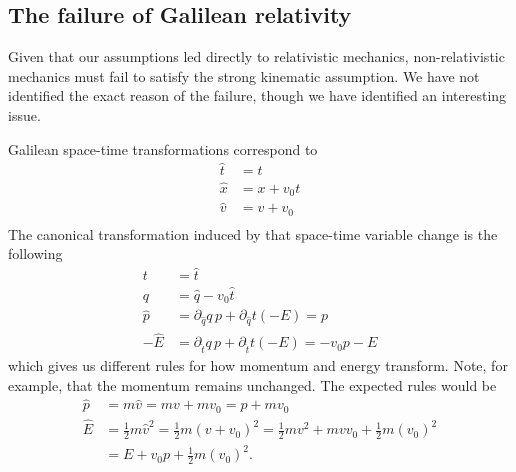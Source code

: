 \subsection{The failure of Galilean relativity}

Given that our assumptions led directly to relativistic mechanics, non-relativistic mechanics must fail to satisfy the strong kinematic assumption. We have not identified the exact reason of the failure, though we have identified an interesting issue.

Galilean space-time transformations correspond to
\begin{equation}
	\begin{aligned}
		\hat{t} &= t \\
		\hat{x} &= x + v_0 t \\
		\hat{v} &= v + v_0 \\
	\end{aligned}
\end{equation}
The canonical transformation induced by that space-time variable change is the following
\begin{equation}
	\begin{aligned}
		t &= \hat{t} \\
		q &= \hat{q} - v_0 \hat{t} \\
		\hat{p} &= \partial_{\hat{q}} q \, p  + \partial_{\hat{q}} t (-E) = p \\
		-\hat{E} &= \partial_{\hat{t}} q \, p  + \partial_{\hat{t}} t (-E) = - v_0 p - E 
	\end{aligned}
\end{equation}
which gives us different rules for how momentum and energy transform. Note, for example, that the momentum remains unchanged. The expected rules would be
\begin{equation}
	\begin{aligned}
		\hat{p} &= m\hat{v} = mv + mv_0 = p + m v_0 \\
		\hat{E} &= \frac{1}{2} m \hat{v}^2 = \frac{1}{2} m (v + v_0)^2 = \frac{1}{2} m v^2 + m v  v_0 + \frac{1}{2} m (v_0)^2 \\
		&= E + v_0 p + \frac{1}{2} m (v_0)^2.
	\end{aligned}
\end{equation}

